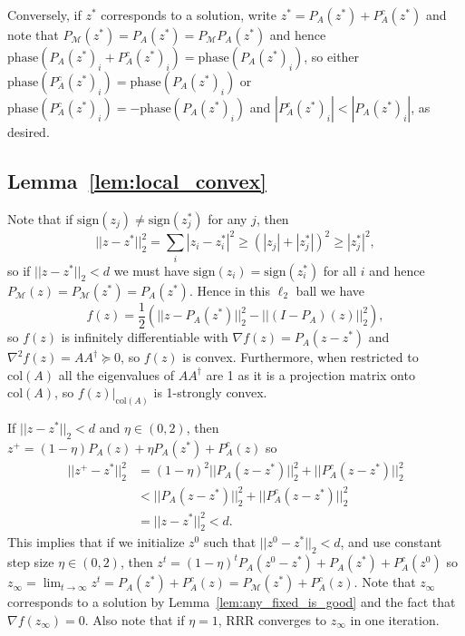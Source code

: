 \documentclass[journal]{IEEEtran}
\theoremstyle{definition}
\theoremstyle{remark}
\theoremstyle{definition}
\theoremstyle{problem}
\theoremstyle{definition}
\newcommand{\col}{\text{col}}
\newcommand{\sign}{\text{sign}}
\newcommand{\phase}{\text{phase}}
\newcommand{\MM}{\mathcal{M}}
\begin{document}
Conversely, if $z^*$ corresponds to a solution, write $z^* = P_A(z^*) + P_A^c(z^*)$ and note that $P_{\MM}(z^*) = P_A(z^*) = P_{\MM}P_A(z^*)$ and hence $\phase(P_A(z^*)_i + P_A^c(z^*)_i) = \phase(P_A(z^*)_i)$, so either $\phase(P_A^c(z^*)_i)=\phase(P_A(z^*)_i)$ or $\phase(P_A^c(z^*)_i)=-\phase(P_A(z^*)_i)$ and $|P_A^c(z^*)_i|<|P_A(z^*)_i|$, as desired.

\subsection{Lemma~\ref{lem:local_convex}}\label{sec:pf_local_convex}
Note that if $\sign(z_j)\neq \sign(z^*_j)$ for any $j$, then
\[ ||z-z^*||_2^2 = \sum_i|z_i-z^*_i|^2 \geq (|z_j| + |z^*_j|)^2 \geq |z^*_j|^2,\]
so if $||z-z^*||_2<d$ we must have $\sign(z_i)=\sign(z^*_i)$ for all $i$ and hence $P_{\MM}(z)=P_{\MM}(z^*)=P_A(z^*)$. Hence in this $\ell_2$ ball we have
\[ f(z) = \frac{1}{2}\left(||z-P_A(z^*)||_2^2 - ||(I-P_A)(z)||_2^2\right),\]
so $f(z)$ is infinitely differentiable with $\nabla f(z) = P_A(z-z^*)$ and $\nabla^2 f(z) = AA^{\dagger}\succeq 0$, so $f(z)$ is convex. Furthermore, when restricted to $\col(A)$ all the eigenvalues of $AA^{\dagger}$ are 1 as it is a projection matrix onto $\col(A)$, so $f(z)|_{\col(A)}$ is 1-strongly convex.

If $||z-z^*||_2<d$ and $\eta\in(0,2)$, then $z^+ = (1-\eta)P_A(z) + \eta P_A(z^*) + P_A^c(z)$ so
\[\begin{aligned} ||z^+-z^*||_2^2 &= (1-\eta)^2||P_A(z-z^*)||_2^2 + ||P_A^c(z-z^*)||_2^2\\
&< ||P_A(z-z^*)||_2^2 + ||P_A^c(z-z^*)||_2^2\\
&= ||z-z^*||_2^2 < d.\end{aligned}\]
This implies that if we initialize $z^0$ such that $||z^0-z^*||_2<d$, and use constant step size $\eta\in(0,2)$, then $z^t = (1-\eta)^tP_A(z^0-z^*) + P_A(z^*) + P_A^c(z^0)$ so $z_{\infty}=\lim_{t\to\infty}z^t = P_A(z^*) + P_A^c(z) = P_{\MM}(z^*) + P_A^c(z)$. Note that $z_{\infty}$ corresponds to a solution by Lemma~\ref{lem:any_fixed_is_good} and the fact that $\nabla f(z_{\infty}) = 0$. Also note that if $\eta = 1$, RRR converges to $z_{\infty}$ in one iteration.
\end{document}
